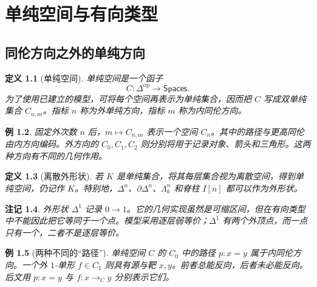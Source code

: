 \documentclass[12pt,oneside,openany,fontset=none]{ctexbook}
\theoremstyle{cn}
\newtheorem{definition}{定义}[chapter]
\newtheorem{example}[definition]{例}
\newtheorem{remark}[definition]{注记}
\numberwithin{equation}{chapter}
\newcommand{\op}{\mathrm{op}}
\begin{document}
\chapter{单纯空间与有向类型}
\section{同伦方向之外的单纯方向}
\begin{definition}[单纯空间]
单纯空间是一个函子
\[
C:\Delta^{\op}\longrightarrow\mathsf{Spaces}.
\]
为了使用已建立的模型，可将每个空间再表示为单纯集合，因而把 $C$ 写成双单纯集合 $C_{n,m}$。指标 $n$ 称为外单纯方向，指标 $m$ 称为内同伦方向。
\end{definition}
\begin{example}
固定外次数 $n$ 后，$m\mapsto C_{n,m}$ 表示一个空间 $C_n$。其中的路径与更高同伦由内方向编码。外方向的 $C_0,C_1,C_2$ 则分别将用于记录对象、箭头和三角形。这两种方向有不同的几何作用。
\end{example}
\begin{definition}[离散外形状]
若 $K$ 是单纯集合，将其每层集合视为离散空间，得到单纯空间，仍记作 $K$。特别地，$\Delta^n$、$\partial\Delta^n$、$\Lambda_k^n$ 和脊柱 $I[n]$ 都可以作为外形状。
\end{definition}
\begin{remark}
外形状 $\Delta^1$ 记录 $0\to1$。它的几何实现虽然是可缩区间，但在有向类型中不能因此把它等同于一个点。模型采用逐层弱等价；$\Delta^1$ 有两个外顶点，而一点只有一个，二者不是逐层等价。
\end{remark}
\begin{example}[两种不同的“路径”]
单纯空间 $C$ 的 $C_0$ 中的路径 $p:x=y$ 属于内同伦方向。一个外 $1$-单形 $f\in C_1$ 则具有源与靶 $x,y$。前者总能反向，后者未必能反向。后文用 $p:x=y$ 与 $f:x\to_Cy$ 分别表示它们。
\end{example}
\end{document}
